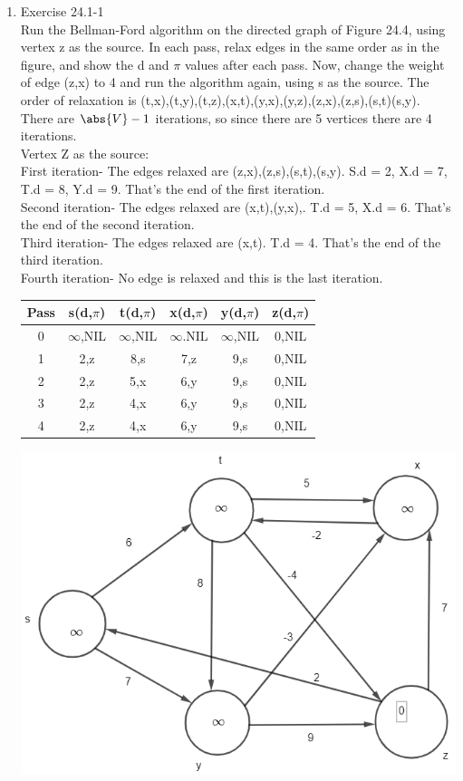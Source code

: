 \documentclass[12pt]{article}
\begin{document}
\begin{enumerate}
\item Exercise 24.1-1 \\
Run the Bellman-Ford algorithm on the directed graph of Figure 24.4, using vertex z as the source. In each pass, relax edges in the same order as in the figure, and show the d and $\pi$ values after each pass. Now, change the weight of edge (z,x) to 4 and run the algorithm again, using s as the source. The order of relaxation is (t,x),(t,y),(t,z),(x,t),(y,x),(y,z),(z,x),(z,s),(s,t)(s,y). There are $\abs{V}-1$ iterations, so since there are 5 vertices there are 4 iterations.\\

Vertex Z as the source: \\
First iteration- The edges relaxed are (z,x),(z,s),(s,t),(s,y). S.d = 2, X.d = 7, T.d = 8, Y.d = 9. That's the end of the first iteration.\\
Second iteration- The edges relaxed are (x,t),(y,x),. T.d = 5, X.d = 6. That's the end of the second iteration.\\
Third iteration- The edges relaxed are (x,t). T.d = 4. That's the end of the third iteration.\\
Fourth iteration- No edge is relaxed and this is the last iteration.\\
\begin{center}
 \begin{tabular}{|c|c c c c c|} 
 \hline
 Pass & s(d,$\pi$) & t(d,$\pi$) & x(d,$\pi$) & y(d,$\pi$) & z(d,$\pi$)\\ [0.5ex] 
 \hline
 0 &$\infty$,NIL &  $\infty$,NIL & $\infty$.NIL & $\infty$,NIL & 0,NIL\\ 
 \hline
 1 & 2,z & 8,s & 7,z & 9,s & 0,NIL \\
 \hline
 2 & 2,z & 5,x & 6,y & 9,s & 0,NIL \\
 \hline
 3 & 2,z & 4,x & 6,y & 9,s & 0,NIL \\
 \hline
 4 & 2,z & 4,x & 6,y & 9,s & 0,NIL \\
 \hline
\end{tabular}
\end{center}
\includegraphics[scale=.65]{24.1-1 Vertex Z/1-1Z.png}\\

\end{enumerate}
\end{document}
